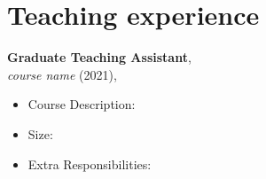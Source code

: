 

\section*{Teaching experience}
\textbf{Graduate Teaching Assistant}, \\
    \emph{course name} (2021),
    \begin{itemize}
    	\item Course Description: 
			\item Size: 
			\item Extra Responsibilities: 
    \end{itemize}
%